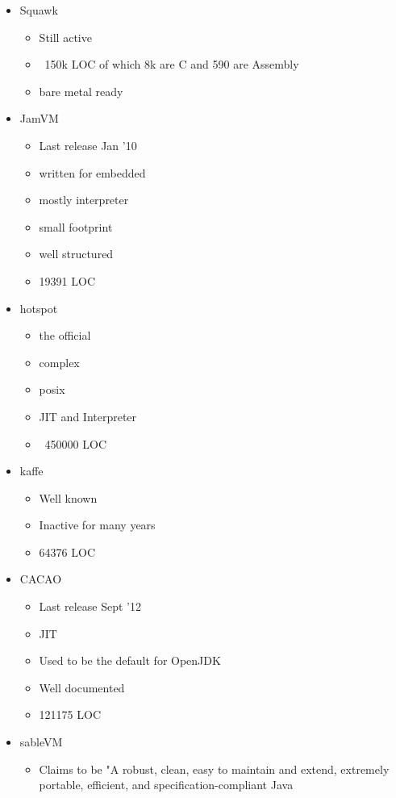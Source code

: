 \documentclass[
a4paper,
12pt,
]{report}
\begin{document}
\begin{itemize}
\item Squawk
  \begin{itemize}
  \item Still active
  \item ~150k LOC of which 8k are C and 590 are Assembly
  \item bare metal ready
  \end{itemize}
\item JamVM
  \begin{itemize}
  \item Last release Jan '10
  \item written for embedded
  \item mostly interpreter
  \item small footprint
  \item well structured
  \item 19391 LOC
  \end{itemize}
\item hotspot
  \begin{itemize}
  \item the official
  \item complex
  \item posix
  \item JIT and Interpreter
  \item ~450000 LOC
  \end{itemize}
\item kaffe
  \begin{itemize}
  \item Well known
  \item Inactive for many years
  \item 64376 LOC
  \end{itemize}
\item CACAO
  \begin{itemize}
  \item Last release Sept '12
  \item JIT
  \item Used to be the default for OpenJDK
  \item Well documented
  \item 121175 LOC
  \end{itemize}
\item sableVM
  \begin{itemize}
  \item Claims to be "A robust, clean, easy to maintain and extend,
     extremely portable, efficient, and specification-compliant Java

\end{itemize}
\end{itemize}
\end{document}
